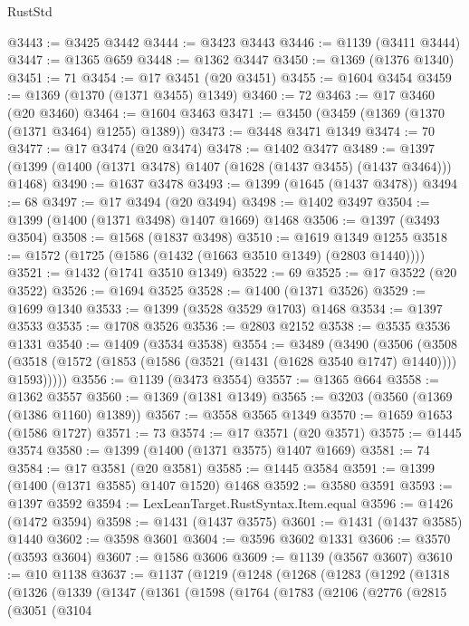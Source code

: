 \begin{lexlean}{RustStd}
\begin{coremodule}
@3443 := @3425 @3442
@3444 := @3423 @3443
@3446 := @1139 (@3411 @3444)
@3447 := @1365 @659
@3448 := @1362 @3447
@3450 := @1369 (@1376 @1340)
@3451 := 71
@3454 := @17 @3451 (@20 @3451)
@3455 := @1604 @3454
@3459 := @1369 (@1370 (@1371 @3455) @1349)
@3460 := 72
@3463 := @17 @3460 (@20 @3460)
@3464 := @1604 @3463
@3471 := @3450 (@3459 (@1369 (@1370 (@1371 @3464) @1255) @1389))
@3473 := @3448 @3471 @1349
@3474 := 70
@3477 := @17 @3474 (@20 @3474)
@3478 := @1402 @3477
@3489 := @1397 (@1399 (@1400 (@1371 @3478) @1407 (@1628 (@1437 @3455) (@1437 @3464))) @1468)
@3490 := @1637 @3478
@3493 := @1399 (@1645 (@1437 @3478))
@3494 := 68
@3497 := @17 @3494 (@20 @3494)
@3498 := @1402 @3497
@3504 := @1399 (@1400 (@1371 @3498) @1407 @1669) @1468
@3506 := @1397 (@3493 @3504)
@3508 := @1568 (@1837 @3498)
@3510 := @1619 @1349 @1255
@3518 := @1572 (@1725 (@1586 (@1432 (@1663 @3510 @1349) (@2803 @1440))))
@3521 := @1432 (@1741 @3510 @1349)
@3522 := 69
@3525 := @17 @3522 (@20 @3522)
@3526 := @1694 @3525
@3528 := @1400 (@1371 @3526)
@3529 := @1699 @1340
@3533 := @1399 (@3528 @3529 @1703) @1468
@3534 := @1397 @3533
@3535 := @1708 @3526
@3536 := @2803 @2152
@3538 := @3535 @3536 @1331
@3540 := @1409 (@3534 @3538)
@3554 := @3489
    (@3490
      (@3506
        (@3508 (@3518 (@1572 (@1853 (@1586 (@3521 (@1431 (@1628 @3540 @1747) @1440)))) @1593)))))
@3556 := @1139 (@3473 @3554)
@3557 := @1365 @664
@3558 := @1362 @3557
@3560 := @1369 (@1381 @1349)
@3565 := @3203 (@3560 (@1369 (@1386 @1160) @1389))
@3567 := @3558 @3565 @1349
@3570 := @1659 @1653 (@1586 @1727)
@3571 := 73
@3574 := @17 @3571 (@20 @3571)
@3575 := @1445 @3574
@3580 := @1399 (@1400 (@1371 @3575) @1407 @1669)
@3581 := 74
@3584 := @17 @3581 (@20 @3581)
@3585 := @1445 @3584
@3591 := @1399 (@1400 (@1371 @3585) @1407 @1520) @1468
@3592 := @3580 @3591
@3593 := @1397 @3592
@3594 := LexLeanTarget.RustSyntax.Item.equal
@3596 := @1426 (@1472 @3594)
@3598 := @1431 (@1437 @3575)
@3601 := @1431 (@1437 @3585) @1440
@3602 := @3598 @3601
@3604 := @3596 @3602 @1331
@3606 := @3570 (@3593 @3604)
@3607 := @1586 @3606
@3609 := @1139 (@3567 @3607)
@3610 := @10 @1138
@3637 := @1137
    (@1219
      (@1248
        (@1268
          (@1283
            (@1292
              (@1318
                (@1326
                  (@1339
                    (@1347
                      (@1361
                        (@1598
                          (@1764
                            (@1783
                              (@2106
                                (@2776
                                  (@2815
                                    (@3051
                                      (@3104

\end{coremodule}
\end{lexlean}
